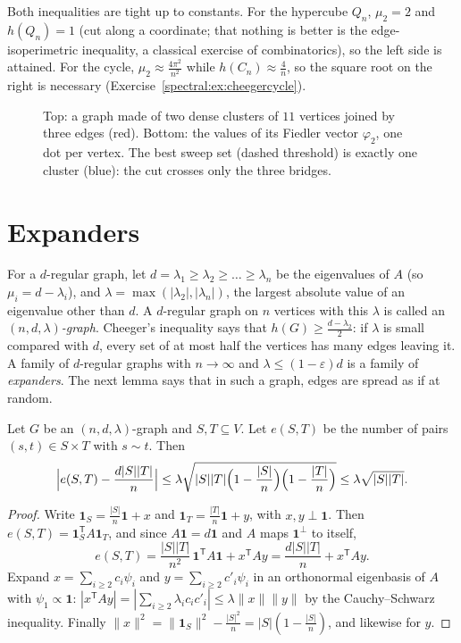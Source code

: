 Both inequalities are tight up to constants. For the hypercube $Q_n$, $\mu_2=2$ and $h(Q_n)=1$ (cut along a coordinate; that nothing is better is the edge-isoperimetric inequality, a classical
exercise of combinatorics), so the left side is attained. For the cycle, $\mu_2\approx\frac{4\pi^2}{n^2}$ while $h(C_n)\approx\frac4n$, so the square root on the right is necessary (Exercise~\ref{spectral:ex:cheegercycle}).

\begin{figure}[ht]
\centering
{}
\caption{Top: a graph made of two dense clusters of $11$ vertices joined by three edges (red). Bottom: the values of its Fiedler vector $\varphi_2$, one dot per vertex. The best
sweep set (dashed threshold) is exactly one cluster (blue): the cut crosses only the three bridges.}
\label{spectral:fig:fiedler}
\end{figure}

\section{Expanders}

For a $d$-regular graph, let $d=\lambda_1\ge\lambda_2\ge\dots\ge\lambda_n$ be the eigenvalues of $A$ (so $\mu_i=d-\lambda_i$), and $\lambda=\max(|\lambda_2|,|\lambda_n|)$, the largest absolute value of an
eigenvalue other than $d$. A $d$-regular graph on $n$ vertices with this $\lambda$ is called an \emph{$(n,d,\lambda)$-graph}. Cheeger's inequality says that $h(G)\ge\frac{d-\lambda_2}2$: if $\lambda$ is small compared
with $d$, every set of at most half the vertices has many edges leaving it. A family of $d$-regular graphs with $n\to\infty$ and $\lambda\le(1-\varepsilon)d$ is a family of \emph{expanders}. The
next lemma says that in such a graph, edges are spread as if at random.

\begin{lemma}\label{spectral:lem:mixing}
Let $G$ be an $(n,d,\lambda)$-graph and $S,T\subseteq V$. Let $e(S,T)$ be the number of pairs $(s,t)\in S\times T$ with $s\sim t$. Then
\[
\Bigl|e(S,T)-\frac{d|S||T|}n\Bigr|\le\lambda\sqrt{|S||T|\Bigl(1-\frac{|S|}n\Bigr)\Bigl(1-\frac{|T|}n\Bigr)}\le\lambda\sqrt{|S||T|}.
\]
\end{lemma}
\begin{proof}
Write $\mathbf1_S=\frac{|S|}n\mathbf1+x$ and $\mathbf1_T=\frac{|T|}n\mathbf1+y$, with $x,y\perp\mathbf1$. Then $e(S,T)=\mathbf1_S^{\mathsf T}A\mathbf1_T$, and since $A\mathbf1=d\mathbf1$ and $A$ maps $\mathbf1^\perp$ to itself,
\[
e(S,T)=\frac{|S||T|}{n^2}\,\mathbf1^{\mathsf T}A\mathbf1+x^{\mathsf T}Ay=\frac{d|S||T|}n+x^{\mathsf T}Ay.
\]
Expand $x=\sum_{i\ge2}c_i\psi_i$ and $y=\sum_{i\ge2}c'_i\psi_i$ in an orthonormal eigenbasis of $A$ with $\psi_1\propto\mathbf1$: $|x^{\mathsf T}Ay|=|\sum_{i\ge2}\lambda_ic_ic'_i|\le\lambda\|x\|\|y\|$ by the Cauchy--Schwarz
inequality. Finally $\|x\|^2=\|\mathbf1_S\|^2-\frac{|S|^2}n=|S|(1-\frac{|S|}n)$, and likewise for $y$.
\end{proof}

